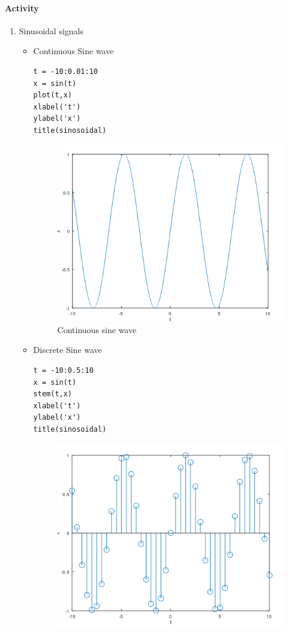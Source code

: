 \documentclass[12pt]{article}
\begin{document}
\paragraph{Activity}
\begin{enumerate}
    \item Sinusoidal signals
    \begin{itemize}
        \item Continuous Sine wave \:
        \begin{Verbatim}[frame = single]
t = -10:0.01:10
x = sin(t)
plot(t,x)
xlabel('t')
ylabel('x')
title(sinosoidal)
        \end{Verbatim}
        \begin{figure}[h!]
            \centering
            \includegraphics[scale =0.4]{labss/Lab2_1a.PNG}
            \caption{Continuous sine wave}
        \end{figure}
        \item Discrete Sine wave \:
        \begin{Verbatim}[frame = single]
t = -10:0.5:10
x = sin(t)
stem(t,x)
xlabel('t')
ylabel('x')
title(sinosoidal)
        \end{Verbatim}
        \begin{figure}[h!]
            \centering
            \includegraphics[scale =0.55]{labss/Lab2_1b.PNG}

\end{figure}
\end{itemize}
\end{enumerate}
\end{document}
